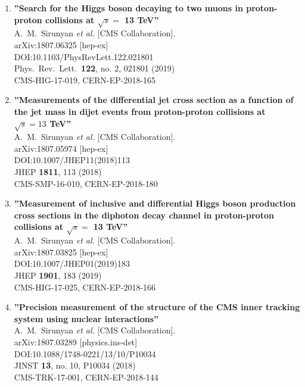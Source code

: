 \begin{enumerate}
\item%
{\bf ''Search for the Higgs boson decaying to two muons in proton-proton collisions at $\sqrt{s} =$ 13 TeV''}
  \\{}A.~M.~Sirunyan {\it et al.} [CMS Collaboration].
  \\{}arXiv:1807.06325 [hep-ex]
  \\{}DOI:10.1103/PhysRevLett.122.021801
  \\{}Phys.\ Rev.\ Lett.\  {\bf 122}, no. 2, 021801 (2019)
  \\{}CMS-HIG-17-019, CERN-EP-2018-165

\item%
{\bf ''Measurements of the differential jet cross section as a function of the jet mass in dijet events from proton-proton collisions at $ \sqrt{s}=13 $ TeV''}
  \\{}A.~M.~Sirunyan {\it et al.} [CMS Collaboration].
  \\{}arXiv:1807.05974 [hep-ex]
  \\{}DOI:10.1007/JHEP11(2018)113
  \\{}JHEP {\bf 1811}, 113 (2018)
  \\{}CMS-SMP-16-010, CERN-EP-2018-180

\item%
{\bf ''Measurement of inclusive and differential Higgs boson production cross sections in the diphoton decay channel in proton-proton collisions at $\sqrt{s}=$ 13 TeV''}
  \\{}A.~M.~Sirunyan {\it et al.} [CMS Collaboration].
  \\{}arXiv:1807.03825 [hep-ex]
  \\{}DOI:10.1007/JHEP01(2019)183
  \\{}JHEP {\bf 1901}, 183 (2019)
  \\{}CMS-HIG-17-025, CERN-EP-2018-166

\item%
{\bf ''Precision measurement of the structure of the CMS inner tracking system using nuclear interactions''}
  \\{}A.~M.~Sirunyan {\it et al.} [CMS Collaboration].
  \\{}arXiv:1807.03289 [physics.ins-det]
  \\{}DOI:10.1088/1748-0221/13/10/P10034
  \\{}JINST {\bf 13}, no. 10, P10034 (2018)
  \\{}CMS-TRK-17-001, CERN-EP-2018-144


\end{enumerate}
